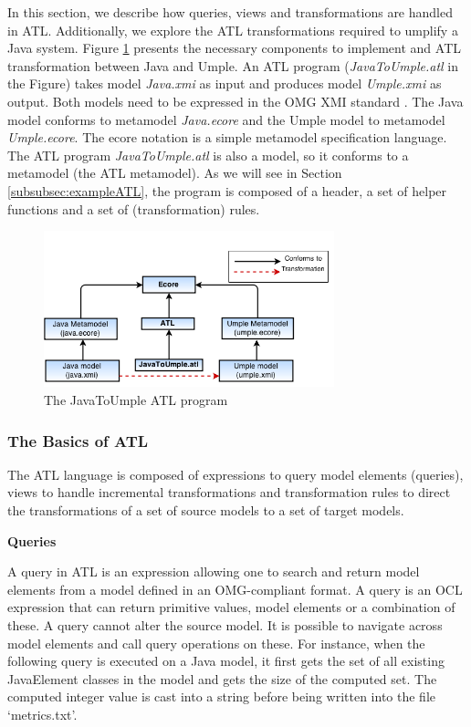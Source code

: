 In this section, we describe how queries, views and transformations are handled in ATL. Additionally, we explore the ATL transformations required to umplify a Java system. Figure \ref{fig:atl} presents the necessary components to implement and ATL transformation between Java and Umple. An ATL program (\textit{JavaToUmple.atl} in the Figure) takes model \textit{Java.xmi} as input and produces model \textit{Umple.xmi} as output. Both models need to be expressed in the OMG XMI standard \cite{xmispec}. The Java model conforms to metamodel \textit{Java.ecore} and the Umple model to metamodel \textit{Umple.ecore}. The ecore \cite{ecore} notation is a simple metamodel specification language. The ATL program \textit{JavaToUmple.atl} is also a model, so it conforms to a metamodel (the ATL metamodel). As we will see in Section \ref{subsubsec:exampleATL}, the program is composed of a header, a set of helper functions and a set of (transformation) rules.

\begin{figure}[h]
\centering
\includegraphics[width=0.75\textwidth]{Figures/ATL_PROGRAM.png} 
\caption{The JavaToUmple ATL program}
\label{fig:atl}
\end{figure}


\subsubsection{The Basics of ATL}

The ATL language is composed of expressions to query model elements (queries), views to handle incremental transformations and transformation rules to direct the transformations of  a set of source models to a set of target models.

\textbf{Queries}

A query in ATL is an expression allowing one to search and return model elements from a model defined in an OMG-compliant format. A query is an OCL expression that can return primitive values, model elements or a combination of these. A query cannot alter the source model. It is possible to navigate across model elements and call query operations on these. For instance, when the following query is executed on a Java model, it first gets the set of all existing JavaElement classes in the model and gets the size of the computed set. The computed integer value is cast into a string before being written into the file `metrics.txt'. 


